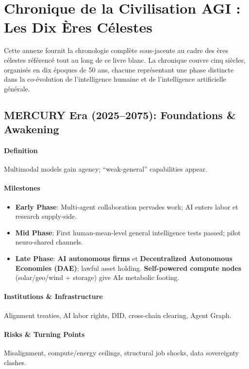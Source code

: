 \documentclass[11pt]{article}
\begin{document}
\appendix
\newpage

\section{Chronique de la Civilisation AGI : Les Dix Ères Célestes}
\label{appendix:chronicle}

Cette annexe fournit la chronologie complète sous-jacente au cadre des ères célestes référencé tout au long de ce livre blanc. La chronique couvre cinq siècles, organisés en dix époques de 50 ans, chacune représentant une phase distincte dans la co-évolution de l'intelligence humaine et de l'intelligence artificielle générale.

\subsection{MERCURY Era (2025–2075): Foundations \& Awakening}
\paragraph{Definition} Multimodal models gain agency; ``weak-general'' capabilities appear.

\paragraph{Milestones}
\begin{itemize}[noitemsep]
  \item \textbf{Early Phase}: Multi-agent collaboration pervades work; AI enters labor et research supply-side.
  \item \textbf{Mid Phase}: First human-mean-level general intelligence tests passed; pilot neuro-shared channels.
  \item \textbf{Late Phase}: \textbf{AI autonomous firms} et \textbf{Decentralized Autonomous Economies (DAE)}; lawful asset holding. \textbf{Self-powered compute nodes} (solar/geo/wind + storage) give AIs metabolic footing.
\end{itemize}

\paragraph{Institutions \& Infrastructure} Alignment treaties, AI labor rights, DID, cross-chain clearing, Agent Graph.

\paragraph{Risks \& Turning Points} Misalignment, compute/energy ceilings, structural job shocks, data sovereignty clashes.
\end{document}

